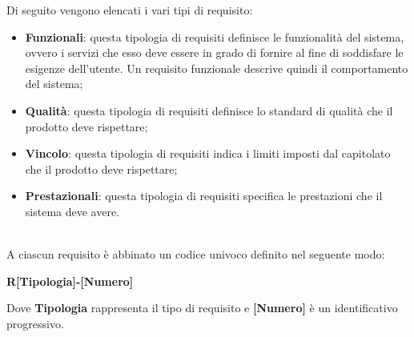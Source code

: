 Di seguito vengono elencati i vari tipi di requisito:
\begin{itemize} 
    \item \textbf{Funzionali}: questa tipologia di requisiti definisce le funzionalità del sistema, ovvero i servizi che esso deve essere in grado di fornire al fine di soddisfare le esigenze dell'utente. Un requisito funzionale descrive quindi il comportamento del sistema;
    \item \textbf{Qualità}: questa tipologia di requisiti definisce lo standard di qualità che il prodotto deve rispettare;
    \item \textbf{Vincolo}: questa tipologia di requisiti indica i limiti imposti dal capitolato che il prodotto deve rispettare;
    \item \textbf{Prestazionali}: questa tipologia di requisiti specifica le prestazioni che il sistema deve avere. 
\end{itemize}

\\
A ciascun requisito è abbinato un codice univoco definito nel seguente modo:
\begin{center}
    \textbf{R[Tipologia]-[Numero]}
\end{center}
Dove \textbf{Tipologia} rappresenta il tipo di requisito e \textbf{[Numero]} è un identificativo progressivo.
